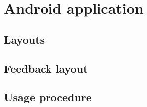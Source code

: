 

\section{Android application}
\label{sec:android_app}

\subsection{Layouts}
\label{ssec:layouts}

\subsection{Feedback layout}
\label{ssec:feedback_layout}

\subsection{Usage procedure}
\label{ssec:usage_procedure}